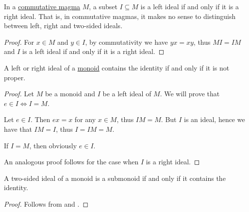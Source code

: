 \begin{proposition}\label{thm:commutative_magma_ideals}
  In a \hyperref[def:magma/commutative]{commutative magma} \( M \), a subset \( I \subseteq M \) is a left ideal if and only if it is a right ideal. That is, in commutative magmas, it makes no sense to distinguish between left, right and two-sided ideals.
\end{proposition}
\begin{proof}
  For \( x \in M \) and \( y \in I \), by commutativity we have \( yx = xy \), thus \( M I = I M \) and \( I \) is a left ideal if and only if it is a right ideal.
\end{proof}

\begin{proposition}\label{thm:proper_ideals_containing_identity}
  A left or right ideal of a \hyperref[def:monoid]{monoid} contains the identity if and only if it is not proper.
\end{proposition}
\begin{proof}
  Let \( M \) be a monoid and \( I \) be a left ideal of \( M \). We will prove that \( e \in I \iff I = M \).

  \SufficiencySubProof Let \( e \in I \). Then \( ex = x \) for any \( x \in M \), thus \( IM = M \). But \( I \) is an ideal, hence we have that \( IM = I \), thus \( I = IM = M \).

  \NecessitySubProof If \( I = M \), then obviously \( e \in I \).

  An analogous proof follows for the case when \( I \) is a right ideal.
\end{proof}

\begin{corollary}\label{thm:monoid_ideal_is_submagma_iff_contains_identity}
  A two-sided ideal of a monoid is a submonoid if and only if it contains the identity.
\end{corollary}
\begin{proof}
  Follows from  and .
\end{proof}

